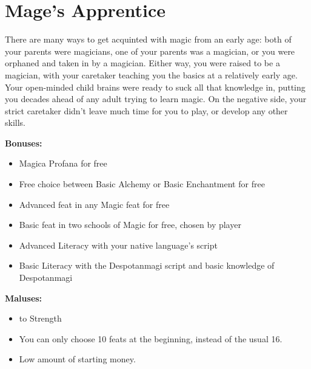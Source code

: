 \section{Mage's Apprentice}
There are many ways to get acquinted with magic from an early age: both of your parents were magicians, one of your parents was a magician, or you were orphaned and taken in by a magician. Either way, you were raised to be a magician, with your caretaker teaching you the basics at a relatively early age. Your open-minded child brains were ready to suck all that knowledge in, putting you decades ahead of any adult trying to learn magic. On the negative side, your strict caretaker didn't leave much time for you to play, or develop any other skills.


\textbf{Bonuses:}
\begin{itemize}
	\item Magica Profana for free
	\item Free choice between Basic Alchemy or Basic Enchantment for free
	\item Advanced feat in any Magic feat  for free
	\item Basic feat in two schools of Magic for free, chosen by player
	\item Advanced Literacy with your native language's script
	\item Basic Literacy with the Despotanmagi script and basic knowledge of Despotanmagi 
\end{itemize}
\textbf{Maluses:}
\begin{itemize}
	\item {} to Strength
	\item You can only choose 10 feats at the beginning, instead of the usual 16.
	\item Low amount of starting money.
\end{itemize}
